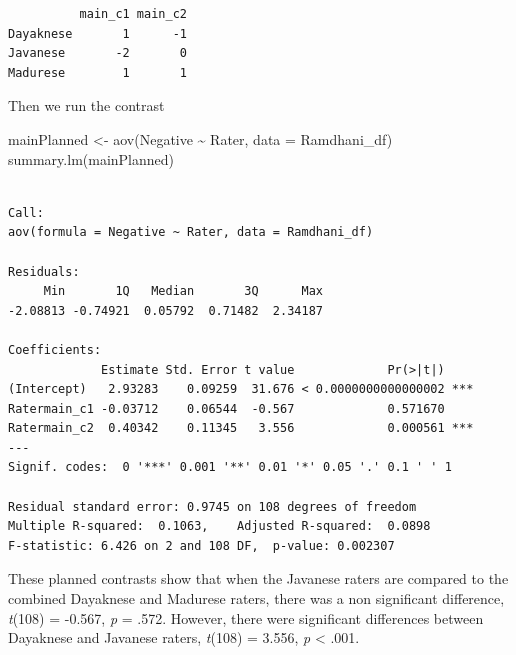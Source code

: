 \documentclass[
  11pt,
]{book}
\newenvironment{Shaded}{\begin{snugshade}}{\end{snugshade}}
\newcommand{\AttributeTok}[1]{\textcolor[rgb]{0.77,0.63,0.00}{#1}}
\newcommand{\DecValTok}[1]{\textcolor[rgb]{0.00,0.00,0.81}{#1}}
\newcommand{\FunctionTok}[1]{\textcolor[rgb]{0.00,0.00,0.00}{#1}}
\newcommand{\NormalTok}[1]{#1}
\newcommand{\OtherTok}[1]{\textcolor[rgb]{0.56,0.35,0.01}{#1}}
\newcommand{\SpecialCharTok}[1]{\textcolor[rgb]{0.00,0.00,0.00}{#1}}
\begin{document}
\begin{verbatim}
          main_c1 main_c2
Dayaknese       1      -1
Javanese       -2       0
Madurese        1       1
\end{verbatim}

Then we run the contrast

\begin{Shaded}
\begin{Highlighting}[]
\NormalTok{mainPlanned }\OtherTok{\textless{}{-}} \FunctionTok{aov}\NormalTok{(Negative }\SpecialCharTok{\textasciitilde{}}\NormalTok{ Rater, }\AttributeTok{data =}\NormalTok{ Ramdhani\_df)}
\FunctionTok{summary.lm}\NormalTok{(mainPlanned)}
\end{Highlighting}
\end{Shaded}

\begin{verbatim}

Call:
aov(formula = Negative ~ Rater, data = Ramdhani_df)

Residuals:
     Min       1Q   Median       3Q      Max 
-2.08813 -0.74921  0.05792  0.71482  2.34187 

Coefficients:
             Estimate Std. Error t value             Pr(>|t|)    
(Intercept)   2.93283    0.09259  31.676 < 0.0000000000000002 ***
Ratermain_c1 -0.03712    0.06544  -0.567             0.571670    
Ratermain_c2  0.40342    0.11345   3.556             0.000561 ***
---
Signif. codes:  0 '***' 0.001 '**' 0.01 '*' 0.05 '.' 0.1 ' ' 1

Residual standard error: 0.9745 on 108 degrees of freedom
Multiple R-squared:  0.1063,    Adjusted R-squared:  0.0898 
F-statistic: 6.426 on 2 and 108 DF,  p-value: 0.002307
\end{verbatim}

\begin{Shaded}
\end{Shaded}

These planned contrasts show that when the Javanese raters are compared to the combined Dayaknese and Madurese raters, there was a non significant difference, \emph{t}(108) = -0.567, \emph{p} = .572. However, there were significant differences between Dayaknese and Javanese raters, \emph{t}(108) = 3.556, \emph{p} \textless{} .001.
\end{document}
